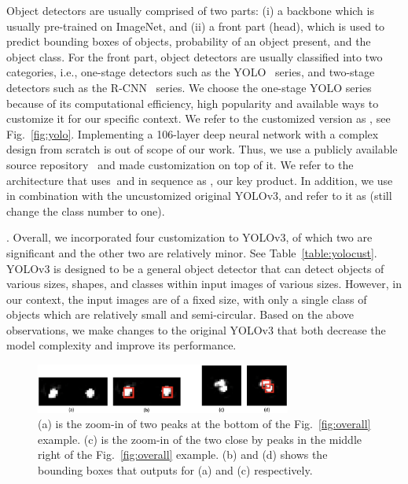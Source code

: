Object detectors are usually comprised of two parts: (i) a backbone which is usually pre-trained on ImageNet, and (ii) a front part (head), which is used to predict bounding boxes of objects, probability of an object present, and the  object class. 
For the front part, object detectors are usually classified into two categories, i.e., one-stage detectors such as the YOLO~\cite{cvpr16-yolo} series, and two-stage detectors such as the R-CNN~\cite{cvpr14-rcnn} series.
We choose the one-stage YOLO series because of its computational efficiency, high popularity and available ways to customize it for our specific context. We refer to the customized version as \yolocust, see Fig.~\ref{fig:yolo}.
Implementing a 106-layer deep neural network with a complex design from scratch is
out of scope of our work. 
Thus, we use a publicly available source repository~\cite{yolo-github} and made customization on top of it.
We refer to the architecture that uses \imgimg $\ $and \yolocust in sequence as \our, our key product.  
In addition, we use \imgimg in combination with the uncustomized original YOLOv3,
and refer to it as \ouryolo (still change the class number to one).

.
Overall, we incorporated four customization to YOLOv3, of which two are significant and the
other two are relatively minor. See Table~\ref{table:yolocust}. YOLOv3 is designed to be a general object detector that can detect objects of various sizes, shapes, and classes within input images
of various sizes. However, in our context, the input images are of a fixed size, with
only a single class of objects which are relatively small and semi-circular. 
Based on the above observations, we make changes to the original YOLOv3 that both 
decrease the model complexity and improve its performance.

\begin{figure}[t]
	\centering
	\includegraphics[width=0.75\textwidth]{chapters/wowmom-pmc/figures/peaks.png}
	\vspace{-0.1in}
	\caption{(a) is the zoom-in of two peaks at the bottom of the Fig.~\ref{fig:overall} example.
	(c) is the zoom-in of the two close by peaks in the middle right of the Fig.~\ref{fig:overall} example. (b) and (d) shows the bounding boxes that \yolocust outputs for (a) and (c) respectively.}
	\label{fig:peaks}
\end{figure}

